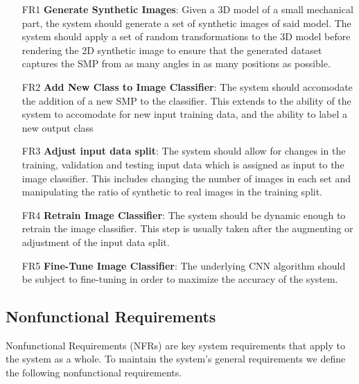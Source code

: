 \documentclass[a4paper,12pt,twoside]{report}
\begin{document}
\begin{itemize}
  \item [FR1] \textbf{Generate Synthetic Images}: Given a 3D model of a small mechanical part, the system should generate a set of synthetic images of said model. The system should apply a set of random transformations to the 3D model before rendering the 2D synthetic image to ensure that the generated dataset captures the SMP from as many angles in as many positions as possible.

  \item [FR2] \textbf{Add New Class to Image Classifier}: The system should accomodate the addition of a new SMP to the classifier. This extends to the ability of the system to accomodate for new input training data, and the ability to label a new output class

  \item [FR3] \textbf{Adjust input data split}: The system should allow for changes in the training, validation and testing input data which is assigned as input to the image classifier. This includes changing the number of images in each set and manipulating the ratio of synthetic to real images in the training split.

  \item [FR4] \textbf{Retrain Image Classifier}: The system should be dynamic enough to retrain the image classifier. This step is usually taken after the augmenting or adjustment of the input data split.

  \item [FR5] \textbf{Fine-Tune Image Classifier}: The underlying CNN algorithm should be subject to fine-tuning in order to maximize the accuracy of the system.
\end{itemize}

\subsection{Nonfunctional Requirements}

Nonfunctional Requirements (NFRs) are key system requirements that apply to the system as a whole. To maintain the system's general requirements we define the following nonfunctional requirements.
\end{document}
